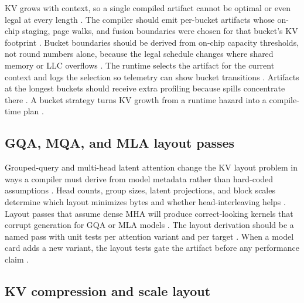 KV grows with context, so a single compiled artifact cannot be optimal or even legal at every length \citep{kwon2023vllm,memoryfloor2026,taxbreak2026}. The compiler should emit per-bucket artifacts whose on-chip staging, page walks, and fusion boundaries were chosen for that bucket's KV footprint \citep{dao2022flashattention,chen2020compilerbasedhardw}. Bucket boundaries should be derived from on-chip capacity thresholds, not round numbers alone, because the legal schedule changes where shared memory or LLC overflows \citep{semianalysis2024tma,memoryfloor2026}. The runtime selects the artifact for the current context and logs the selection so telemetry can show bucket transitions \citep{kwon2023vllm,patel2025llminference}. Artifacts at the longest buckets should receive extra profiling because spills concentrate there \citep{memoryfloor2026,taxbreak2026}. A bucket strategy turns KV growth from a runtime hazard into a compile-time plan \citep{chen2020compilerbasedhardw,patel2025llminference}.

\subsection{GQA, MQA, and MLA layout passes}

Grouped-query and multi-head latent attention change the KV layout problem in ways a compiler must derive from model metadata rather than hard-coded assumptions \citep{kwon2023vllm,dao2022flashattention,liu2024deepseekv3}. Head counts, group sizes, latent projections, and block scales determine which layout minimizes bytes and whether head-interleaving helps \citep{patel2025llminference,memoryfloor2026,chen2020compilerbasedhardw}. Layout passes that assume dense MHA will produce correct-looking kernels that corrupt generation for GQA or MLA models \citep{kwon2023vllm,patel2025llminference}. The layout derivation should be a named pass with unit tests per attention variant and per target \citep{chen2020compilerbasedhardw,memoryfloor2026}. When a model card adds a new variant, the layout tests gate the artifact before any performance claim \citep{patel2025llminference,memoryfloor2026}.

\subsection{KV compression and scale layout}

